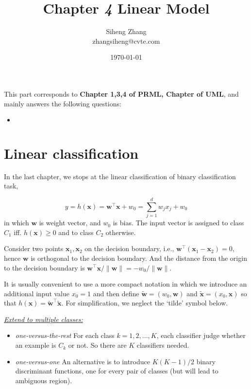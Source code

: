 \documentclass{article}
\author{Siheng Zhang\\zhangsiheng@cvte.com}
\title{Chapter \textbf{\textit{4}} Linear Model}
\date{\today}
\begin{document}
\maketitle  

This part corresponds to \textbf{Chapter 1,3,4 of PRML, Chapter of UML}, and mainly answers the following questions:

\begin{itemize}
\item 
\end{itemize}

\tableofcontents
\newpage

\section{Linear classification}

	In the last chapter, we stops at the linear classification of binary classification task,
	
	\begin{equation}
	y=h(\mathbf{x})=\mathbf{w}^\top \mathbf{x} + w_0 = \sum_{j=1}^d w_j x_j + w_0
	\end{equation}
in which $\mathbf{w}$ is weight vector, and $w_0$ is bias. The input vector is assigned to class $C_1$ iff. $h(\mathbf{x})\geq 0$ and to class $C_2$ otherwise.

	Consider two points $\mathbf{x}_1,\mathbf{x}_2$ on the decision boundary, i.e., $\mathbf{w}^\top (\mathbf{x}_1 - \mathbf{x}_2) = 0$, hence $\mathbf{w}$ is orthogonal to the decision boundary. And the distance from the origin to the decision boundary is $\mathbf{w}^\top \mathbf{x} / \|\mathbf{w}\|=-w_0/\|\mathbf{w}\|$.
	
	It is usually convenient to use a more compact notation in which we introduce an additional input value $x_0 = 1$ and then define $\tilde{\mathbf{w}} = (w_0, \mathbf{w})$ and $\tilde{\mathbf{x}} = (x_0, \mathbf{x})$ so that $h(\mathbf{x}) = \tilde{\mathbf{w}}^\top \tilde{\mathbf{x}}$. For simplification, we neglect the `tilde' symbol below.

	\textit{\underline{Extend to multiple classes:}} \begin{itemize}
	\item \textit{one-versus-the-rest} For each class $k=1,2,...,K$, each classifier judge whether an example is $C_k$ or not. So there are $K$ classifiers needed.
	\item \textit{one-versus-one} An alternative is to introduce $K(K-1)/2$ binary discriminant functions, one for every pair of classes (but will lead to ambiguous region).
	\end{itemize}	
	
\end{document}
